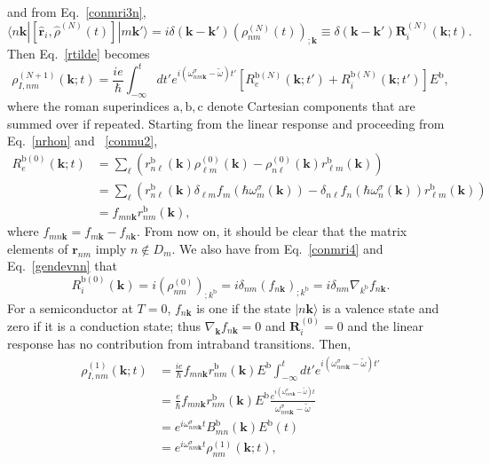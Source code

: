 and from Eq.~\eqref{conmri3n},
\begin{equation}\label{conmri4}
\langle n\mathbf{k}|
[\hat{\mathbf{r}}_i,\hat{\rho}^{(N)}(t)]
|m\mathbf{k}'\rangle
=i \delta(\mathbf{k}-\mathbf{k}') (\rho^{(N)}_{nm}(t))_{;\mathbf{k}}
\equiv \delta(\mathbf{k}-\mathbf{k}')\mathbf{R}_i^{(N)}(\mathbf{k};t)
.
\end{equation}
Then Eq.~\eqref{rtilde} becomes
\begin{equation}\label{rtilde2}
\rho^{(N+1)}_{I,nm}(\mathbf{k};t)
=\frac{ie}{\hbar}\int_{-\infty}^t dt'
e^{i(\omega^\sigma_{nm\mathbf{k}}-\tilde{\omega})t'}
\left[R_e^{\mathrm{b}(N)}(\mathbf{k};t')+R_i^{\mathrm{b}(N)}(\mathbf{k};t')\right]E^{\mathrm{b}}
,
\end{equation}
where the roman superindices
$\mathrm{a},\mathrm{b},\mathrm{c}$ denote Cartesian components that are summed over if repeated.
Starting from the linear response and proceeding from Eq.~\eqref{nrhon} and ~\eqref{conmu2},
\begin{align}\label{R0e}
R_e^{\mathrm{b}(0)}(\mathbf{k};t)
&=
\sum_{\ell}
\left(
r^{\mathrm{b}}_{n\ell}(\mathbf{k})
\rho^{(0)}_{\ell m}(\mathbf{k})
-
\rho^{(0)}_{n\ell}(\mathbf{k})
r^{\mathrm{b}}_{\ell m}(\mathbf{k})
\right)
\nonumber \\
&=
\sum_{\ell}
\left(
r^{\mathrm{b}}_{n\ell}(\mathbf{k})
\delta_{\ell m}f_m(\hbar\omega^\sigma_m(\mathbf{k}))
-
\delta_{n\ell}f_n(\hbar\omega^{\sigma}_{n}(\mathbf{k}))
r^{\mathrm{b}}_{\ell m}(\mathbf{k})
\right)
\nonumber \\
&=
f_{mn\mathbf{k}}
r^{\mathrm{b}}_{nm}(\mathbf{k})
,
\end{align}
where $f_{mn\mathbf{k}}=f_{m\mathbf{k}}-f_{n\mathbf{k}}$.
From now on,
it should be clear that the matrix elements of $\mathbf{r}_{nm}$ imply
$n\notin D_m$.
We also have from Eq.~\eqref{conmri4} and Eq.~\eqref{gendevnn} that
\begin{equation}\label{R0i}
R_i^{\mathrm{b}(0)}(\mathbf{k})=i(\rho^{(0)}_{nm})_{;k^{\mathrm{b}}}=i\delta_{nm}(f_{n\mathbf{k}})_{;k^{\mathrm{b}}}=i\delta_{nm}\nabla_{k^{\mathrm{b}}} f_{n\mathbf{k}}
.
\end{equation}
For a semiconductor at $T=0$, $f_{n\mathbf{k}}$ is one if the state
$|n\mathbf{k}\rangle$ is a valence state and zero if it is a conduction state; 
thus $\nabla_\mathbf{k} f_{n\mathbf{k}}=0$ and $\mathbf{R}_i^{(0)}=0$ and
the linear response has no contribution from
intraband transitions.
 Then,
\begin{align}\label{rtilde2n}
\rho^{(1)}_{I,nm}(\mathbf{k};t)
&=\frac{ie}{\hbar}
f_{mn\mathbf{k}}
r^{\mathrm{b}}_{nm}(\mathbf{k})E^{\mathrm{b}}
\int_{-\infty}^t dt'
e^{i(\omega^\sigma_{nm\mathbf{k}}-\tilde{\omega})t'}
\nonumber \\
&=\frac{e}{\hbar}
f_{mn\mathbf{k}}
r^{\mathrm{b}}_{nm}(\mathbf{k})E^{\mathrm{b}}
\frac{e^{i(\omega^\sigma_{nm\mathbf{k}}-\tilde{\omega})t}}
{\omega^\sigma_{nm\mathbf{k}}-\tilde{\omega}}
\nonumber \\
&=
e^{i\omega^\sigma_{nm\mathbf{k}}t}
B^{\mathrm{b}}_{mn}(\mathbf{k})E^{\mathrm{b}}(t)
\nonumber \\
&=
e^{i\omega^\sigma_{nm\mathbf{k}}t}
\rho^{(1)}_{nm}(\mathbf{k};t)
,
\end{align}
